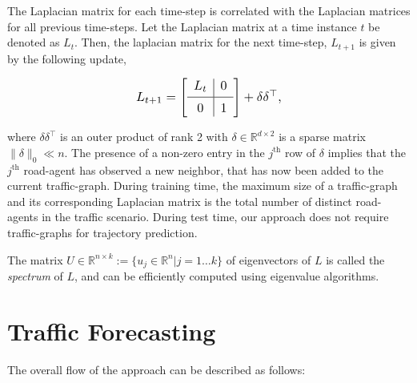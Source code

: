 \documentclass[10pt,twocolumn,letterpaper]{article}
\newcommand{\Vts}[1]{\lVert #1 \rVert}
\newcommand{\bb}[1]{\mathbb{#1}}
\newcommand\Tstrut{\rule{0pt}{2.6ex}}         \newcommand\Bstrut{\rule[-1.3ex]{0pt}{0pt}}   \newcommand\mathdash{\text{\normalfont --}}
\theoremstyle{plain}
\begin{document}
The Laplacian matrix for each time-step is correlated with the Laplacian matrices for all previous time-steps. Let the Laplacian matrix at a time instance $t$ be denoted as $L_t$. Then, the laplacian matrix for the next time-step, $L_{t+1}$ is given by the following update,

\begin{equation}
\resizebox{0.4\columnwidth}{!}{
$L_{t+1} =
\left[
\begin{array}{c|c}
L_{t} \Bstrut & 0 \Bstrut\\
\hline
0 \Tstrut & 1
\end{array}
\right] + \delta\delta^\top$,
}
\label{eq: A_update}
\end{equation}

\noindent where $\delta\delta^\top$ is an outer product of rank 2 with $\delta \in \bb{R}^{d \times 2} $ is a sparse matrix $\Vts{\delta}_0 \ll n$. The presence of a non-zero entry in the $j^\textrm{th}$ row of $\delta$ implies that the $j^\textrm{th}$ road-agent has observed a new neighbor, that has now been added to the current traffic-graph. During training time, the maximum size of a traffic-graph and its corresponding Laplacian matrix is the total number of distinct road-agents in the traffic scenario. During test time, our approach does not require traffic-graphs for trajectory prediction.

The matrix $U \in \mathbb{R}^{n \times k} := \{ u_j \in \mathbb{R}^{n} | j = 1 \dots k\}$ of eigenvectors of $L$ is called the \emph{spectrum} of $L$, and can be efficiently computed using eigenvalue algorithms.





 \section{Traffic Forecasting}
The overall flow of the approach can be described as follows:
\end{document}
